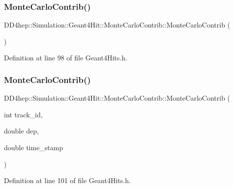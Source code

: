 \subsubsection{\texorpdfstring{Monte\+Carlo\+Contrib()}{MonteCarloContrib()}\hspace{0.1cm}{\footnotesize\ttfamily [1/4]}}
{\footnotesize\ttfamily D\+D4hep\+::\+Simulation\+::\+Geant4\+Hit\+::\+Monte\+Carlo\+Contrib\+::\+Monte\+Carlo\+Contrib (\begin{DoxyParamCaption}{ }\end{DoxyParamCaption})\hspace{0.3cm}{\ttfamily [inline]}}



Definition at line 98 of file Geant4\+Hits.\+h.

\hypertarget{struct_d_d4hep_1_1_simulation_1_1_geant4_hit_1_1_monte_carlo_contrib_a3f041eca3c402f2a8ba5fec12151e42f}{}\label{struct_d_d4hep_1_1_simulation_1_1_geant4_hit_1_1_monte_carlo_contrib_a3f041eca3c402f2a8ba5fec12151e42f} 
\subsubsection{\texorpdfstring{Monte\+Carlo\+Contrib()}{MonteCarloContrib()}\hspace{0.1cm}{\footnotesize\ttfamily [2/4]}}
{\footnotesize\ttfamily D\+D4hep\+::\+Simulation\+::\+Geant4\+Hit\+::\+Monte\+Carlo\+Contrib\+::\+Monte\+Carlo\+Contrib (\begin{DoxyParamCaption}\item[{int}]{track\+\_\+id,  }\item[{double}]{dep,  }\item[{double}]{time\+\_\+stamp }\end{DoxyParamCaption})\hspace{0.3cm}{\ttfamily [inline]}}



Definition at line 101 of file Geant4\+Hits.\+h.

\hypertarget{struct_d_d4hep_1_1_simulation_1_1_geant4_hit_1_1_monte_carlo_contrib_af4908b6ddf6b878d9d529a5e614ca0de}{}\label{struct_d_d4hep_1_1_simulation_1_1_geant4_hit_1_1_monte_carlo_contrib_af4908b6ddf6b878d9d529a5e614ca0de} 
